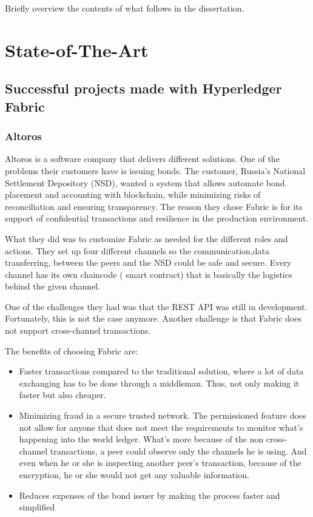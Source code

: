 \documentclass[a4paper,11pt]{report}
\begin{document}
Briefly overview the contents of what follows in the dissertation.



\chapter{State-of-The-Art}

\label{state}
\section{Successful projects made with Hyperledger Fabric}
\label{successfulFabric}

\subsection{Altoros}
\label{altoros}
Altoros is a software company that delivers different solutions. One of the problems their customers have is issuing bonds. The customer, Russia's National Settlement Depository (NSD), wanted a system that allows automate bond placement and accounting with blockchain, while minimizing risks of reconciliation and ensuring transparency. The reason they chose Fabric is for its support of confidential transactions and resilience in the production environment. \cite{altoros}

	What they did was to customize Fabric as needed for the different roles and actions. They set up four different channels so the communication,data transferring, between the peers and the NSD could be safe and secure. Every channel has its own chaincode ( smart contract) that is basically the logistics behind the given channel.
	
	One of the challenges they had was that the REST API was still in development. Fortunately, this is not the case anymore. Another challenge is that Fabric does not support cross-channel transactions. \cite{altorosDemo}
	
	The benefits of choosing Fabric are: 
	\begin{itemize}
	
\item Faster transactions compared to the traditional solution, where a lot of data exchanging has to be done through a middleman. Thus, not only making it faster but also cheaper. 
\item Minimizing fraud in a secure trusted network. The permissioned feature does not allow for anyone that does not meet the requirements to monitor what’s happening into the world ledger. What’s more because of the non cross-channel transactions, a peer could observe only the channels he is using. And even when he or she is inspecting another peer’s transaction, because of the encryption, he or she would not get any valuable information. 
\item Reduces expenses of the bond issuer by making the process faster and simplified
	\end{itemize}
\end{document}
